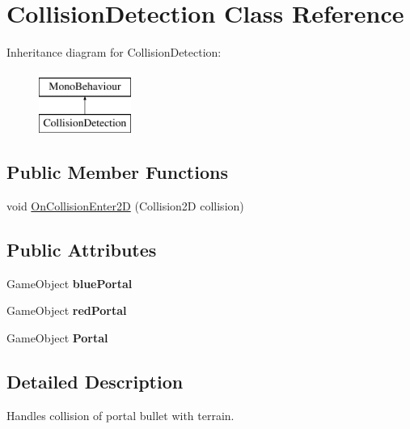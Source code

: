 \hypertarget{class_collision_detection}{}\section{Collision\+Detection Class Reference}
\label{class_collision_detection}
Inheritance diagram for Collision\+Detection\+:\begin{figure}[H]
\begin{center}
\leavevmode
\includegraphics[height=2.000000cm]{class_collision_detection}
\end{center}
\end{figure}
\subsection*{Public Member Functions}
\begin{DoxyCompactItemize}
\item 
void \mbox{\hyperlink{class_collision_detection_ae5c7d4d990b3c888dc8866821a3d0366}{On\+Collision\+Enter2D}} (Collision2D collision)
\end{DoxyCompactItemize}
\subsection*{Public Attributes}
\begin{DoxyCompactItemize}
\item 
\mbox{\label{class_collision_detection_aaf744c321d2d561f7436054f3b13f11e}} 
Game\+Object {\bfseries blue\+Portal}
\item 
\mbox{\label{class_collision_detection_ac9bfcd85369795afc00d0241c86076a2}} 
Game\+Object {\bfseries red\+Portal}
\item 
\mbox{\label{class_collision_detection_a84fa3b656c956bfc72efb56c6fcf3ab6}} 
Game\+Object {\bfseries Portal}
\end{DoxyCompactItemize}


\subsection{Detailed Description}
Handles collision of portal bullet with terrain. 

